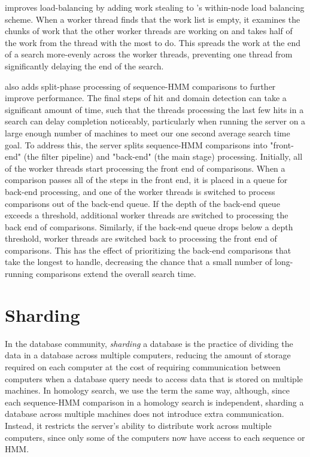 \documentclass[notoc,justified,openany]{tufte-book}    %
\newcommand{\Hmmserver}{\mono{Hmmserver}\xspace}
\newcommand{\hmmpgmd}{\mono{hmmpgmd}\xspace}
\begin{document}
\Hmmserver improves load-balancing by adding work stealing to \hmmpgmd's within-node load balancing scheme.  When a worker thread finds that the work list is empty, it examines the chunks of work that the other worker threads are working on and takes half of the work from the thread with the most to do.  This spreads the work at the end of a search more-evenly across the worker threads, preventing one thread from significantly delaying the end of the search.

\Hmmserver also adds split-phase processing of sequence-HMM comparisons to further improve performance.  The final steps of hit and domain detection can take a significant amount of time, such that the threads processing the last few hits in a search can delay completion noticeably, particularly when running the server on a large enough number of machines to meet our one second average search time goal.  To address this, the server splits sequence-HMM comparisons into "front-end" (the filter pipeline) and "back-end" (the main stage) processing.  Initially, all of the worker threads start processing the front end of comparisons.  When a comparison passes all of the steps in the front end, it is placed in a queue for back-end processing, and one of the worker threads is switched to process comparisons out of the back-end queue.  If the depth of the back-end queue exceeds a threshold, additional worker threads are switched to processing the back end of comparisons.  Similarly, if the back-end queue drops below a depth threshold, worker threads are switched back to processing the front end of comparisons.  This has the effect of prioritizing the back-end comparisons that take the longest to handle, decreasing the chance that a small number of long-running comparisons extend the overall search time.


\section{Sharding}
In the database community, \emph{sharding} a database is the practice of dividing the data in a database across multiple computers, reducing the amount of storage required on each computer at the cost of requiring communication between computers when a database query needs to access data that is stored on multiple machines.  In homology search, we use the term the same way, although, since each sequence-HMM comparison in a homology search is independent, sharding a database across multiple machines does not introduce extra communication.  Instead, it restricts the server's ability to distribute work across multiple computers, since only some of the computers now have access to each sequence or HMM.
\end{document}
